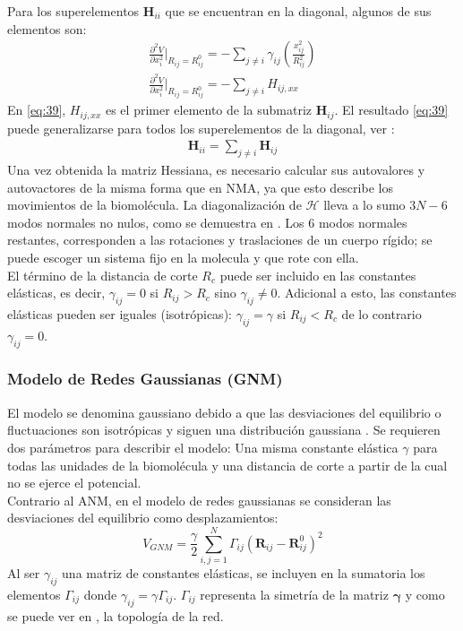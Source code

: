 Para los superelementos $\mathbf{H}_{ii}$ que se encuentran en la diagonal, algunos de sus elementos son:
\begin{eqnarray}\label{eq:39}
\frac{\partial^2 V }{\partial x_i^2}\bigg|_{R_{ij}=R_{ij}^0}=-\sum_{j\neq i}\gamma_{ij}\left(\frac{x_{ij}^2}{R_{ij}^2}\right) \nonumber \\
\frac{\partial^2 V }{\partial x_i^2}\bigg|_{R_{ij}=R_{ij}^0}=-\sum_{j\neq i} H_{ij,xx}
\end{eqnarray}
En \eqref{eq:39}, $H_{ij,xx}$ es el primer elemento de la submatriz $\mathbf{H}_{ij}$. El resultado \eqref{eq:39} puede generalizarse para todos los superelementos de la diagonal, ver \cite{Lezon2009}:
\begin{eqnarray}\label{eq:40}
\mathbf{H}_{ii}=\sum_{j\neq i}\mathbf{H}_{ij}
\end{eqnarray}
Una vez obtenida la matriz Hessiana, es necesario calcular sus autovalores y autovactores de la misma forma que en NMA, ya que esto describe los movimientos de la biomol\'{e}cula. La diagonalizaci\'{o}n de $\mathcal{H}$ lleva a lo sumo $3N-6$ modos normales no nulos, como se demuestra en \cite{Tirion1996}. Los 6 modos normales restantes, corresponden a las rotaciones y traslaciones de un cuerpo r\'{i}gido; se puede escoger un sistema fijo en la molecula y que rote con ella.\\

El t\'{e}rmino de la distancia de corte $R_c$ puede ser incluido en las constantes el\'{a}sticas, es decir, $\gamma_{ij}=0$ si  $R_{ij}>R_c$ sino $\gamma_{ij}\neq 0$. Adicional a esto, las constantes el\'{a}sticas pueden ser iguales (isotr\'{o}picas): $\gamma_{ij}=\gamma$ si  $R_{ij}<R_c$ de lo contrario  $\gamma_{ij}=0$.
\subsubsection{Modelo de Redes Gaussianas (GNM)}\label{ssec:GNM}
El modelo se denomina gaussiano debido a que las desviaciones del equilibrio o fluctuaciones son isotr\'{o}picas y siguen una distribuci\'{o}n gaussiana \cite{Rader2006}. Se requieren dos par\'{a}metros para describir el modelo: Una misma constante el\'{a}stica $\gamma$ para todas las unidades de la biomol\'{e}cula y una distancia de corte a partir de la cual no se ejerce el potencial.\\

Contrario al ANM, en el modelo de redes gaussianas se consideran las desviaciones del equilibrio como desplazamientos:
\begin{equation}\label{eq:27}
V_{GNM}=\frac{\gamma}{2}\sum_{i,j=1}^{N}\Gamma_{ij}\left(\textbf{R}_{ij}-\textbf{R}_{ij}^0\right)^2
\end{equation}
Al ser $\gamma_{ij}$ una matriz de constantes el\'{a}sticas, se incluyen en la sumatoria los elementos $\Gamma_{ij}$ donde $\gamma_{ij}=\gamma\Gamma_{ij}$. $\Gamma_{ij}$ representa la simetr\'{i}a de la matriz $ \mathbf{\gamma}$ y como se puede ver en \cite{Rader2006}, la topolog\'{i}a de la red.\\

